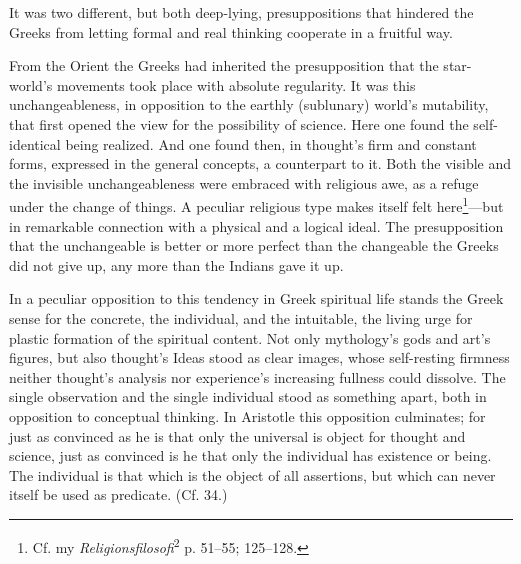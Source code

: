 \documentclass[12pt,a4paper]{book}
\newcommand{\opage}[1]{\marginnote{\footnotesize\textit{[#1]}}}
\begin{document}
It was two different, but both deep-lying, presuppositions that hindered
the Greeks from letting formal and real thinking cooperate in a fruitful
way.

From the Orient the Greeks had inherited the presupposition that the
star-world's movements took place with absolute regularity. It was this
unchangeableness, in opposition to the earthly (sublunary) world's
mutability, that first opened the view for the possibility of science. Here
one found the self-identical being realized. And one found then, in
thought's firm and constant forms, expressed in the general concepts, a
counterpart to it. Both the visible and \opage{127}the invisible unchangeableness were
embraced with religious awe, as a refuge under the change of things. A
peculiar religious type makes itself felt here\footnote{Cf. my
\emph{Religionsfilosofi}\textsuperscript{2} p. 51--55; 125--128.}---but in
remarkable connection with a physical and a logical ideal. The
presupposition that the unchangeable is better or more perfect than the
changeable the Greeks did not give up, any more than the Indians gave it
up.

In a peculiar opposition to this tendency in Greek spiritual life stands the
Greek sense for the concrete, the individual, and the intuitable, the
living urge for plastic formation of the spiritual content. Not only
mythology's gods and art's figures, but also thought's Ideas stood as clear
images, whose self-resting firmness neither thought's analysis nor
experience's increasing fullness could dissolve. The single observation and
the single individual stood as something apart, both in opposition to
conceptual thinking. In Aristotle this opposition culminates; for just as
convinced as he is that only the universal is object for thought and
science, just as convinced is he that only the individual has existence or
being. The individual is that which is the object of all assertions, but
which can never itself be used as predicate. (Cf. 34.)
\end{document}
